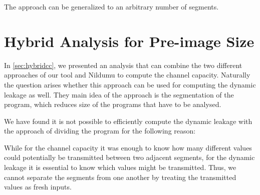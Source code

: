 The approach can be generalized to an arbitrary number of segments.

\section{Hybrid Analysis for Pre-image Size}
In \ref{sec:hybridcc}, we presented an analysis that can combine the two different approaches of our tool and Nildumu to compute the channel capacity. Naturally the question arises whether this approach can be used for computing the dynamic leakage as well. They main idea of the approach is the segmentation of the program, which reduces size of the programs that have to be analysed.

We have found it is not possible to efficiently compute the dynamic leakage with the approach of dividing the program for the following reason:

While for the channel capacity it was enough to know how many different values could potentially be transmitted between two adjacent segments, for the dynamic leakage it is essential to know which values might be transmitted. Thus, we cannot separate the segments from one another by treating the transmitted values as fresh inputs.

